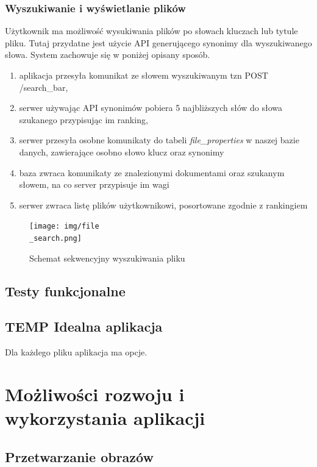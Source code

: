 \documentclass[12pt,a4paper,twoside]{article}
\begin{document}
\subsubsection*{Wyszukiwanie i wyświetlanie plików}
Użytkownik ma możliwość wysukiwania plików po słowach kluczach lub tytule pliku. Tutaj przydatne jest użycie API generującego synonimy dla wyszukiwanego słowa. System zachowuje się w poniżej opisany sposób.
\begin{enumerate}
	\item aplikacja przesyła komunikat ze słowem wyszukiwanym tzn POST /search\_bar,
	\item serwer używając API synonimów pobiera 5 najbliższych słów do słowa szukanego przypisując im ranking,
	\item serwer przesyła osobne komunikaty do tabeli \textit{file\_properties} w naszej bazie danych, zawierające osobno słowo klucz oraz synonimy
	\item baza zwraca komunikaty ze znalezionymi dokumentami oraz szukanym słowem, na co server przypisuje im wagi
	\item serwer zwraca listę plików użytkownikowi, posortowane zgodnie z rankingiem
\end{enumerate}
\begin{figure}[h]
\centering
  \texttt{[image: img/file\\\_search.png]}
  \caption{Schemat sekwencyjny wyszukiwania pliku}
\end{figure}
\newpage
\subsection{Testy funkcjonalne}
\subsection{TEMP Idealna aplikacja}
Dla każdego pliku aplikacja ma opcje. 
\section{Możliwości rozwoju i wykorzystania aplikacji}
\subsection{Przetwarzanie obrazów}
\end{document}
